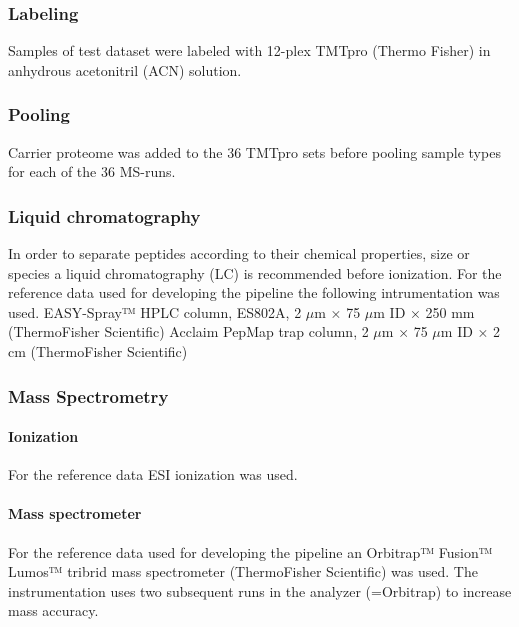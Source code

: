 \documentclass[
  11pt,
]{article}
\begin{document}
\hypertarget{labeling}{%
\subsubsection{Labeling}\label{labeling}}

Samples of test dataset were labeled with 12-plex TMTpro (Thermo Fisher)
in anhydrous acetonitril (ACN) solution.

\hypertarget{pooling}{%
\subsubsection{Pooling}\label{pooling}}

Carrier proteome was added to the 36 TMTpro sets before pooling sample
types for each of the 36 MS-runs.

\hypertarget{liquid-chromatography}{%
\subsubsection{Liquid chromatography}\label{liquid-chromatography}}

In order to separate peptides according to their chemical properties,
size or species a liquid chromatography (LC) is recommended before
ionization. For the reference data used for developing the pipeline the
following intrumentation was used. EASY-Spray™ HPLC column, ES802A, 2
\(\mu\)m × 75 \(\mu\)m ID × 250 mm (ThermoFisher Scientific) Acclaim
PepMap trap column, 2 \(\mu\)m × 75 \(\mu\)m ID × 2 cm (ThermoFisher
Scientific)

\hypertarget{mass-spectrometry-1}{%
\subsubsection{Mass Spectrometry}\label{mass-spectrometry-1}}

\hypertarget{ionization}{%
\paragraph{Ionization}\label{ionization}}

For the reference data ESI ionization was used.

\hypertarget{mass-spectrometer}{%
\paragraph{Mass spectrometer}\label{mass-spectrometer}}

For the reference data used for developing the pipeline an Orbitrap™
Fusion™ Lumos™ tribrid mass spectrometer (ThermoFisher Scientific) was
used. The instrumentation uses two subsequent runs in the analyzer
(=Orbitrap) to increase mass accuracy.
\end{document}
